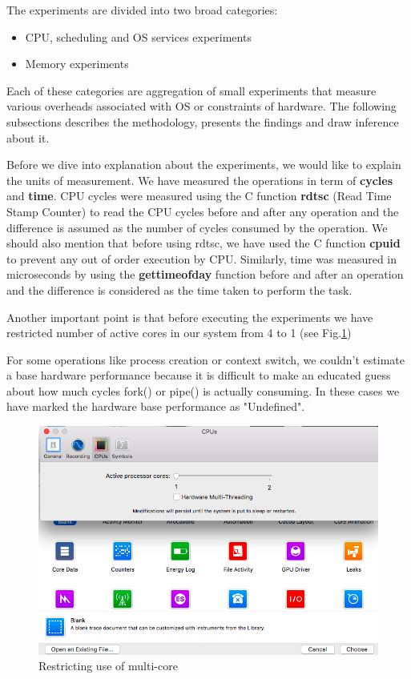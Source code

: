 \documentclass[conference]{IEEEtran}
\begin{document}
The experiments are divided into two broad categories:
\begin{itemize}
\item
CPU, scheduling and OS services experiments
\item
Memory experiments 
\end{itemize}
Each of these categories are aggregation of small experiments that measure various overheads associated with OS or constraints of hardware. The following subsections describes the methodology, presents the findings and draw inference about it.
\par Before we dive into explanation about the experiments, we would like to explain the units of measurement. We have measured the operations in term of \textbf{cycles} and \textbf{time}. CPU cycles were measured using the C function \textbf{rdtsc} (Read Time Stamp Counter) to read the CPU cycles before and after any operation and the difference is assumed as the number of cycles consumed by the operation. We should also mention that before using rdtsc, we have used the C function \textbf{cpuid} to prevent any out of order execution by CPU. Similarly, time was measured in microseconds by using the \textbf{gettimeofday} function before and after an operation and the difference is considered as the time taken to perform the task.   
\par Another important point is that before executing the experiments we have restricted number of active cores in our system from 4 to 1 (see Fig.\ref{fig:onecore})
\par For some operations like process creation or context switch, we couldn't estimate a base hardware performance because it is difficult to make an educated guess about how much cycles fork() or pipe() is actually consuming. In these cases we have marked the hardware base performance as "Undefined".

\begin{figure}[h]
\centering
\includegraphics[scale=0.3]{OneCore.png}
\caption{Restricting use of multi-core}
\label{fig:onecore}
\end{figure}
\end{document}
